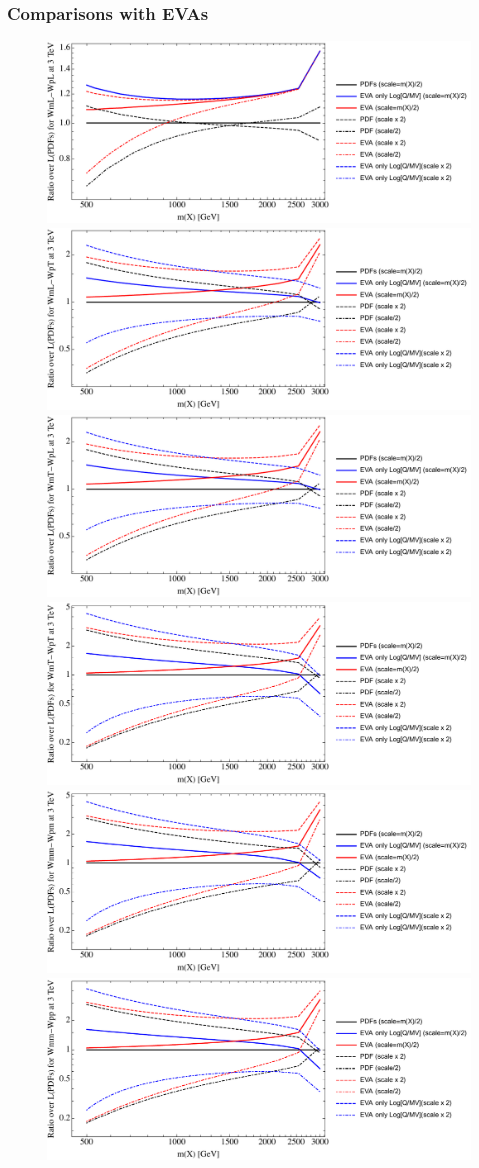 \documentclass[a4paper,11pt]{article}
\begin{document}
\clearpage
\subsubsection{Comparisons with EVAs}



\begin{figure}[ht]
\includegraphics[width=0.46\linewidth]{Notebooks/PlotLumi/3TeV/ratios/WmL-WpL.pdf}
\includegraphics[width=0.46\linewidth]{Notebooks/PlotLumi/3TeV/ratios/WmL-WpT.pdf}
\includegraphics[width=0.46\linewidth]{Notebooks/PlotLumi/3TeV/ratios/WmT-WpL.pdf}
\includegraphics[width=0.46\linewidth]{Notebooks/PlotLumi/3TeV/ratios/WmT-WpT.pdf}
\includegraphics[width=0.46\linewidth]{Notebooks/PlotLumi/3TeV/ratios/Wmm-Wpm.pdf}
\includegraphics[width=0.46\linewidth]{Notebooks/PlotLumi/3TeV/ratios/Wmm-Wpp.pdf}
\end{figure}
\end{document}
